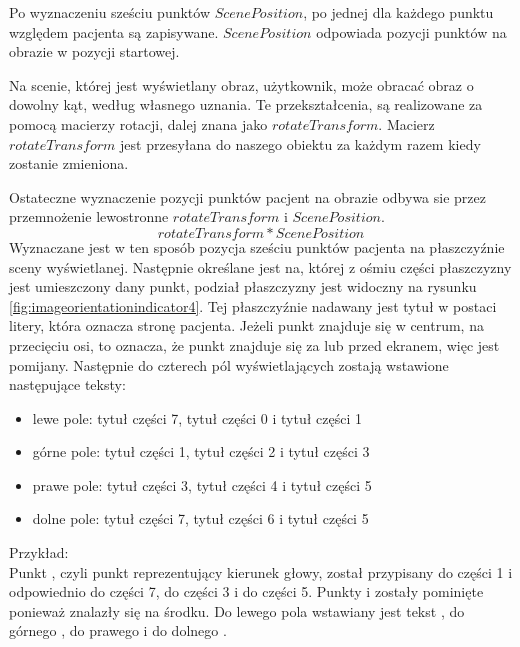 \par
Po wyznaczeniu sześciu punktów $ScenePosition$, po jednej dla każdego punktu względem pacjenta są zapisywane. $ScenePosition$ odpowiada pozycji punktów na obrazie w pozycji startowej.

\par
Na scenie, której jest wyświetlany obraz, użytkownik, może obracać obraz o dowolny kąt, według własnego uznania.
Te przekształcenia, są realizowane za pomocą macierzy rotacji, dalej znana jako $rotateTransform$.
Macierz $rotateTransform$ jest przesyłana do naszego obiektu  za każdym razem kiedy zostanie zmieniona.

\par
Ostateczne wyznaczenie pozycji punktów pacjent na obrazie odbywa sie przez przemnożenie lewostronne $rotateTransform$ i $ScenePosition$.
\[rotateTransform * ScenePosition\]
Wyznaczane jest w ten sposób pozycja sześciu punktów pacjenta na płaszczyźnie sceny wyświetlanej.
Następnie określane jest na, której z ośmiu części płaszczyzny jest umieszczony dany punkt, podział płaszczyzny jest widoczny na rysunku \ref{fig:imageorientationindicator4}.
Tej płaszczyźnie nadawany jest tytuł w postaci litery, która oznacza stronę pacjenta.
Jeżeli punkt znajduje się w centrum, na przecięciu osi, to oznacza, że punkt znajduje się za lub przed ekranem, więc jest pomijany.
Następnie do czterech pól wyświetlających zostają wstawione następujące teksty:
\begin{itemize}
    \item lewe pole: tytuł części 7, tytuł części 0 i tytuł części 1
    \item górne pole: tytuł części 1, tytuł części 2 i tytuł części 3
    \item prawe pole: tytuł części 3, tytuł części 4 i tytuł części 5
    \item dolne pole: tytuł części 7, tytuł części 6 i tytuł części 5
\end{itemize}

\par
Przykład:\\
Punkt , czyli punkt reprezentujący kierunek głowy, został przypisany do części 1 i odpowiednio  do części 7,  do części 3 i  do części 5.
Punkty  i  zostały pominięte ponieważ znalazły się na środku.
Do lewego pola wstawiany jest tekst , do górnego , do prawego  i do dolnego .

